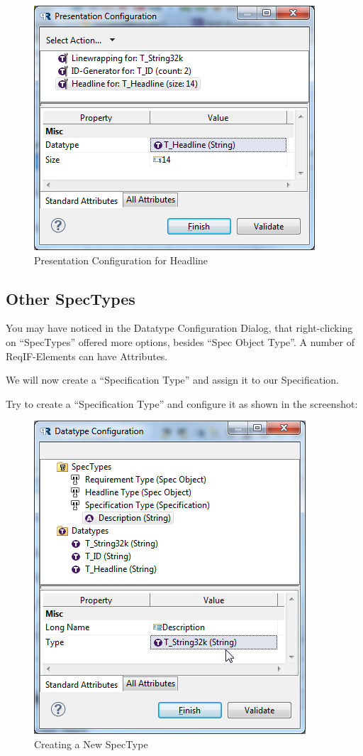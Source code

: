 \begin{figure}[h!]
\centering      
\includegraphics[width=0.8\linewidth]{../rmf-images/pror_datatype_headline2.png}      
\caption{Presentation Configuration for Headline}      
\label{fig:headlineConfig2}
\end{figure}

\subsection{Other SpecTypes}

You may have noticed in the Datatype Configuration Dialog, that
right-clicking on ``SpecTypes'' offered more options, besides ``Spec
Object Type''. A number of ReqIF-Elements can have Attributes.

We will now create a ``Specification Type'' and assign it to our
Specification.

Try to create a ``Specification Type'' and configure it as shown in the
screenshot:

\begin{figure}[h!]
\centering      
\includegraphics[width=0.8\linewidth]{../rmf-images/pror_new_spectype.png}      
\caption{Creating a New SpecType}      
\label{fig:newSpecType}
\end{figure}

